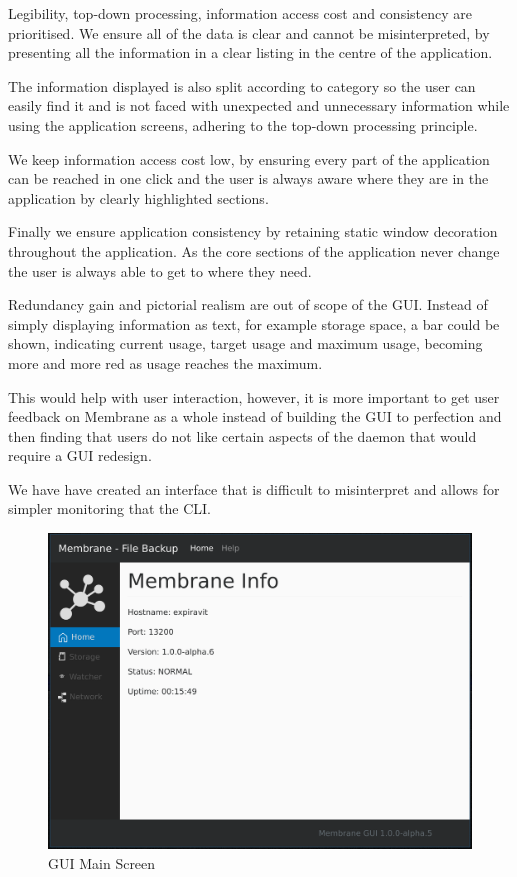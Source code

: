 \documentclass[11pt, a4paper, twoside]{report}
\begin{document}
Legibility, top-down processing, information access cost and consistency are prioritised. We ensure all of the data is clear and cannot be misinterpreted, by presenting all the information in a clear listing in the centre of the application.

The information displayed is also split according to category so the user can easily find it and is not faced with unexpected and unnecessary information while using the application screens, adhering to the top-down processing principle.

We keep information access cost low, by ensuring every part of the application can be reached in one click and the user is always aware where they are in the application by clearly highlighted sections.

Finally we ensure application consistency by retaining static window decoration throughout the application. As the core sections of the application never change the user is always able to get to where they need.

Redundancy gain and pictorial realism are out of scope of the GUI. Instead of simply displaying information as text, for example storage space, a bar could be shown, indicating current usage, target usage and maximum usage, becoming more and more red as usage reaches the maximum.

This would help with user interaction, however, it is more important to get user feedback on Membrane as a whole instead of building the GUI to perfection and then finding that users do not like certain aspects of the daemon that would require a GUI redesign. 

We have have created an interface that is difficult to misinterpret and allows for simpler monitoring that the CLI.

\begin{figure}
 \centering
 \includegraphics[width=\textwidth]{gui-main}
 \caption{GUI Main Screen}
 \label{fig:gui-main}
\end{figure}
\end{document}
